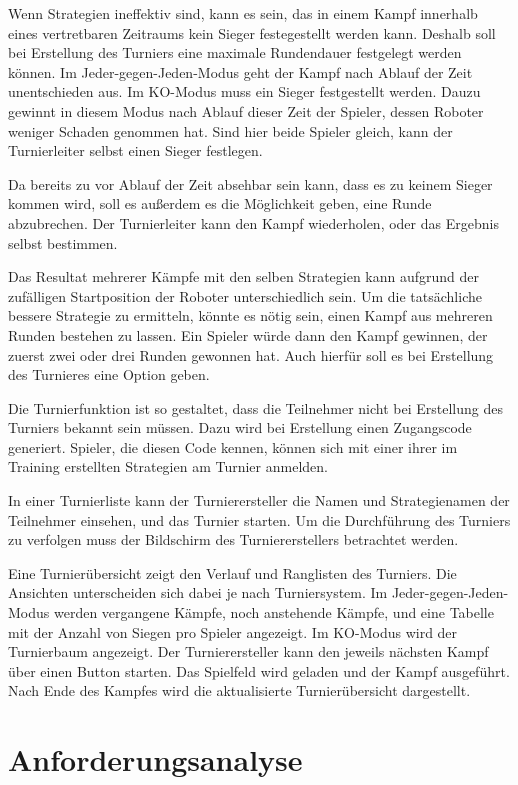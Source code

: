 Wenn Strategien ineffektiv sind, kann es sein, das in einem Kampf innerhalb eines vertretbaren
Zeitraums kein Sieger festegestellt werden kann. Deshalb soll bei Erstellung des Turniers eine
maximale Rundendauer festgelegt werden können. Im Jeder-gegen-Jeden-Modus geht der Kampf nach Ablauf
der Zeit unentschieden aus. Im KO-Modus muss ein Sieger festgestellt werden. Dauzu gewinnt in
diesem Modus nach Ablauf dieser Zeit der Spieler, dessen Roboter weniger Schaden genommen hat. Sind
hier beide Spieler gleich, kann der Turnierleiter selbst einen Sieger festlegen.

Da bereits zu vor Ablauf der Zeit absehbar sein kann, dass es zu keinem Sieger kommen wird, soll es
außerdem es die Möglichkeit geben, eine Runde abzubrechen. Der Turnierleiter kann den Kampf
wiederholen, oder das Ergebnis selbst bestimmen.

Das Resultat mehrerer Kämpfe mit den selben Strategien kann aufgrund der zufälligen Startposition
der Roboter unterschiedlich sein. Um die tatsächliche bessere Strategie zu ermitteln, könnte es
nötig sein, einen Kampf aus mehreren Runden bestehen zu lassen. Ein Spieler würde dann den Kampf
gewinnen, der zuerst zwei oder drei Runden gewonnen hat. Auch hierfür soll es bei Erstellung des
Turnieres eine Option geben.

Die Turnierfunktion ist so gestaltet, dass die Teilnehmer nicht bei Erstellung des Turniers bekannt
sein müssen. Dazu wird bei Erstellung einen Zugangscode generiert. Spieler, die diesen Code kennen,
können sich mit einer ihrer im Training erstellten Strategien am Turnier anmelden.

In einer Turnierliste kann der Turnierersteller die Namen und Strategienamen der Teilnehmer
einsehen, und das Turnier starten. Um die Durchführung des Turniers zu verfolgen muss der Bildschirm
des Turniererstellers betrachtet werden.

Eine Turnierübersicht zeigt den Verlauf und Ranglisten des Turniers. Die Ansichten unterscheiden
sich dabei je nach Turniersystem. Im Jeder-gegen-Jeden-Modus werden vergangene Kämpfe, noch
anstehende Kämpfe, und eine Tabelle mit der Anzahl von Siegen pro Spieler angezeigt. Im KO-Modus
wird der Turnierbaum angezeigt. Der Turnierersteller kann den jeweils nächsten Kampf über einen
Button starten. Das Spielfeld wird geladen und der Kampf ausgeführt. Nach Ende des Kampfes wird die
aktualisierte Turnierübersicht dargestellt.


\section{Anforderungsanalyse}

